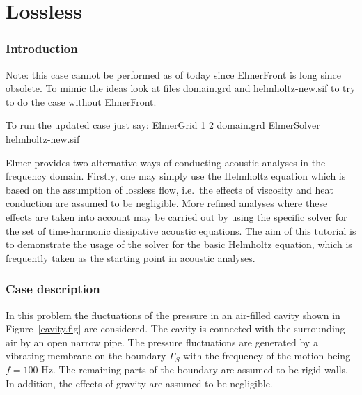 \chapter{Lossless }



\subsection*{Introduction}

Note: this case cannot be performed as of today since ElmerFront is
long since obsolete. To mimic the ideas look at files domain.grd and
helmholtz-new.sif to try to do the case without ElmerFront.

To run the updated case just say:
\ttbegin
ElmerGrid 1 2 domain.grd
ElmerSolver helmholtz-new.sif
\ttend

Elmer provides two alternative ways of conducting acoustic analyses in the
frequency domain. Firstly, one may simply use the Helmholtz equation which 
is based on the assumption of lossless flow, i.e.\ the effects of viscosity 
and heat conduction are assumed to be negligible. More refined analyses where 
these effects are taken into account may be carried out by using the specific 
solver for the set of time-harmonic dissipative acoustic equations. 
The aim of this tutorial is to demonstrate the usage of the solver
for the basic Helmholtz equation, which is frequently taken as the starting
point in acoustic analyses. 

\subsection*{Case description}

In this problem the fluctuations of the pressure in an air-filled
cavity shown in Figure~\ref{cavity.fig} are considered. The cavity is 
connected with the surrounding air by an open narrow pipe. The pressure 
fluctuations are generated by a vibrating membrane on the boundary $\Gamma_S$ 
with the frequency of the motion being $f=100$ Hz. 
The remaining parts of the boundary are assumed to be rigid walls. 
In addition, the effects of gravity are assumed to be negligible.

